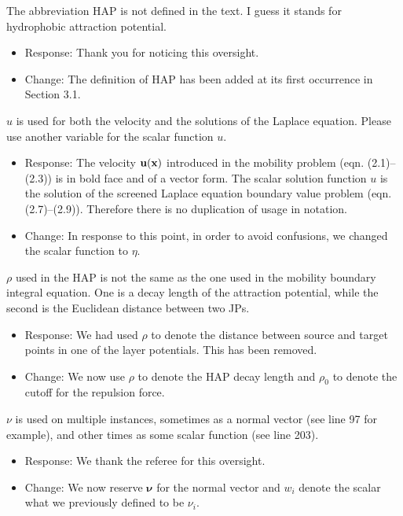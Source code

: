 \documentclass[11pt]{article}
\newcommand{\comment}[1]{{\color{blue} #1}}
\begin{document}
\noindent
\comment{The abbreviation HAP is not defined in the text. I guess it stands for hydrophobic attraction potential.
}
\begin{itemize}
  \item Response: Thank you for noticing this oversight. 
  \item Change: The definition of HAP has been added at its first occurrence in Section 3.1. 
\end{itemize}

\noindent
\comment{$u$ is used for both the velocity and the solutions of the
Laplace equation. Please use another variable for the scalar function
$u$.}
\begin{itemize}
  \item Response: The velocity ${\bf u}({\bf x})$ introduced in the mobility problem (eqn. (2.1)--(2.3)) is in bold face and of a vector form. The scalar solution function $u$ is the solution of the screened Laplace equation boundary value problem (eqn. (2.7)--(2.9)). Therefore there is no duplication of usage in notation. 
  \item Change: In response to this point, in order to avoid confusions, we changed the scalar function to $\eta$.
\end{itemize}

\noindent
\comment{$\rho$ used in the HAP is not the same as the one used in the
mobility boundary integral equation. One is a decay length of the
attraction potential, while the second is the Euclidean distance between
two JPs.}
\begin{itemize}
  \item Response: We had used $\rho$ to denote the distance between source and
    target points in one of the layer potentials. This has been removed.

  \item Change: We now use $\rho$ to denote the HAP decay length and $\rho_0$ to
    denote the cutoff for the repulsion force.
\end{itemize}

\noindent
\comment{$\nu$ is used on multiple instances, sometimes as a normal
vector (see line 97 for example), and other times as some scalar
function (see line 203).}
\begin{itemize}
  \item Response: We thank the referee for this oversight.
  \item Change: We now reserve $\boldsymbol{\nu}$ for the normal vector and
    $w_i$ denote the scalar what we previously defined to be $\nu_i$.
\end{itemize}
\end{document}
